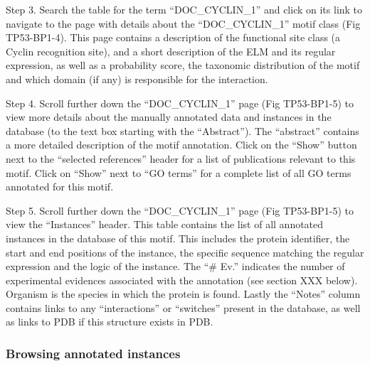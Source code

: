 Step 3. Search the table for the term ``DOC\_CYCLIN\_1'' and click on
its link to navigate to the page with details about the
``DOC\_CYCLIN\_1'' motif class (Fig TP53-BP1-4). This page contains a
description of the functional site class (a Cyclin recognition site),
and a short description of the ELM and its regular expression, as well
as a probability score, the taxonomic distribution of the motif and
which domain (if any) is responsible for the interaction.


Step 4. Scroll further down the ``DOC\_CYCLIN\_1'' page (Fig TP53-BP1-5)
to view more details about the manually annotated data and instances in
the database (to the text box starting with the ``Abstract''). The
``abstract'' contains a more detailed description of the motif
annotation. Click on the ``Show'' button next to the ``selected
references'' header for a list of publications relevant to this motif.
Click on ``Show'' next to ``GO terms'' for a complete list of all GO
terms annotated for this motif.

Step 5. Scroll further down the ``DOC\_CYCLIN\_1'' page (Fig TP53-BP1-5)
to view the ``Instances'' header. This table contains the list of all
annotated instances in the database of this motif. This includes the
protein identifier, the start and end positions of the instance, the
specific sequence matching the regular expression and the logic of the
instance. The ``\# Ev.'' indicates the number of experimental evidences
associated with the annotation (see section XXX below). Organism is the
species in which the protein is found. Lastly the ``Notes'' column
contains links to any ``interactions'' or ``switches'' present in the
database, as well as links to PDB if this structure exists in PDB.

\subsubsection{Browsing annotated
instances}\label{browsing-annotated-instances}

